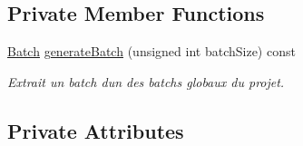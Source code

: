 \subsection*{Private Member Functions}
\begin{DoxyCompactItemize}
\item 
\hyperlink{classApplication_a9888f02149ca3b8ffa499ee07426cd1d}{Batch} \hyperlink{classApplication_a201ce31cdd2a89861bf6ac0f9f09371f}{generate\+Batch} (unsigned int batch\+Size) const
\begin{DoxyCompactList}\small\item\em Extrait un batch d\textquotesingle{}un des batchs globaux du projet. \end{DoxyCompactList}\end{DoxyCompactItemize}
\subsection*{Private Attributes}
